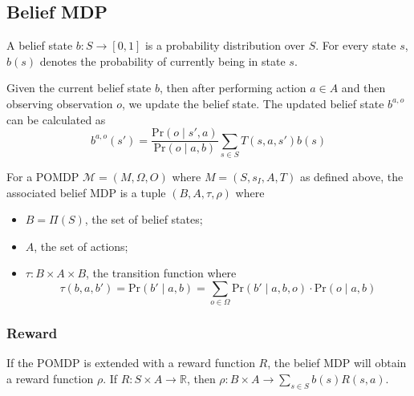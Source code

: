 \subsection{Belief MDP}

\begin{definition}
A belief state $b:S\to [0,1]$ is a probability distribution over $S$. For every state $s$, $b(s)$ denotes the probability of currently being in state $s$.
\end{definition}

\begin{definition}
Given the current belief state $b$, then after performing action $a\in A$ and then observing observation $o$, we update the belief state. The updated belief state $b^{a,o}$ can be calculated as
\[b^{a,o}(s')= \frac{\text{Pr}(o\mid s',a)}{\text{Pr}(o\mid a,b)}\sum\limits_{s\in S}T(s,a,s')b(s)\]
\end{definition}

\begin{definition}
For a POMDP $\mathcal{M}=(M,\Omega,O)$ where $M=(S,s_I,A,T)$ as defined above, the associated belief MDP is a tuple $(B,A,\tau,\rho)$ where 
\begin{itemize}
\item $B=\Pi(S)$, the set of belief states;
\item $A$, the set of actions;
\item $\tau:B\times A\times B$, the transition function where 
\[\tau(b,a,b')= \text{Pr}(b'\mid a,b)=\sum\limits_{o\in\Omega}\text{Pr}(b'\mid a,b,o)\cdot \text{Pr}(o\mid a,b)\]
\end{itemize}
\end{definition}

\subsubsection*{Reward}
If the POMDP is extended with a reward function $R$, the belief MDP will obtain a reward function $\rho$. If $R:S\times A\to \mathbb{R}$, then $\rho:B\times A\to \sum\limits_{s\in S}b(s)R(s,a)$. 

